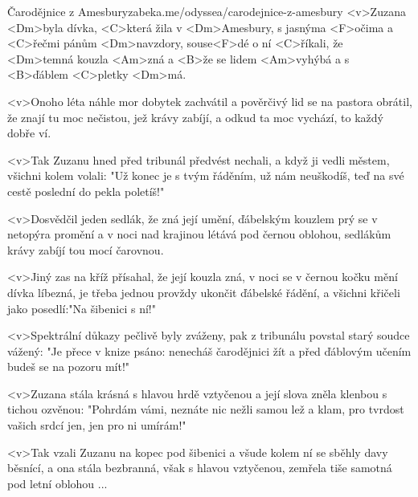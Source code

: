\begin{song}[Asonance]{2}{Čarodějnice z Amesbury}{zabeka.me/odyssea/carodejnice-z-amesbury}
	<v>Zuzana <Dm>byla dívka, <C>která žila v <Dm>Amesbury,
	s jasnýma <F>očima a <C>řečmi pánům <Dm>navzdory,
	souse<F>dé o ní <C>říkali, že <Dm>temná kouzla <Am>zná
	a <B>že se lidem <Am>vyhýbá a s <B>ďáblem <C>pletky <Dm>má.

	<v>Onoho léta náhle mor dobytek zachvátil
	a pověrčivý lid se na pastora obrátil,
	že znají tu moc nečistou, jež krávy zabíjí,
	a odkud ta moc vychází, to každý dobře ví.

	<v>Tak Zuzanu hned před tribunál předvést nechali,
	a když ji vedli městem, všichni kolem volali:
	"Už konec je s tvým řáděním, už nám neuškodíš,
	teď na své cestě poslední do pekla poletíš!"

	<v>Dosvědčil jeden sedlák, že zná její umění,
	ďábelským kouzlem prý se v netopýra promění
	a v noci nad krajinou létává pod černou oblohou,
	sedlákům krávy zabíjí tou mocí čarovnou.

	<v>Jiný zas na kříž přísahal, že její kouzla zná,
	v noci se v černou kočku mění dívka líbezná,
	je třeba jednou provždy ukončit ďábelské řádění,
	a všichni křičeli jako posedlí:"Na šibenici s ní!"

	<v>Spektrální důkazy pečlivě byly zváženy,
	pak z tribunálu povstal starý soudce vážený:
	"Je přece v knize psáno: nenecháš čarodějnici žít
	a před ďáblovým učením budeš se na pozoru mít!"

	<v>Zuzana stála krásná s hlavou hrdě vztyčenou
	a její slova zněla klenbou s tichou ozvěnou:
	"Pohrdám vámi, neznáte nic nežli samou lež a klam,
	pro tvrdost vašich srdcí jen, jen pro ni umírám!"

	<v>Tak vzali Zuzanu na kopec pod šibenici
	a všude kolem ní se sběhly davy běsnící,
	a ona stála bezbranná, však s hlavou vztyčenou,
	zemřela tiše samotná pod letní oblohou ...
\end{song}

